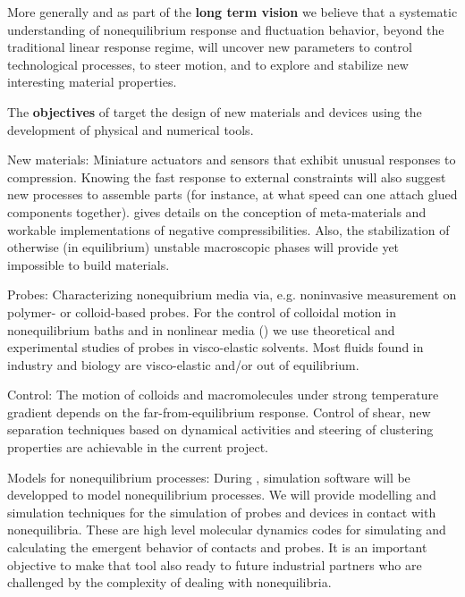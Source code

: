 More generally and as part of the {\bf long term vision} we believe that a systematic
understanding of nonequilibrium response and fluctuation behavior, beyond the traditional
linear response regime, will uncover new parameters to control technological processes, to
steer motion, and to explore and stabilize new interesting material properties.

The {\bf objectives} of \TheProject target the design of new materials and devices using the
development of physical and numerical tools.
\begin{compactdesc}
\item[New materials:] Miniature actuators and sensors that exhibit unusual responses to
compression. Knowing the fast response to external constraints will also suggest new
processes to assemble parts (for instance, at what speed can one attach glued components
together).  gives details on the conception of meta-materials and workable
implementations of negative compressibilities.
%
Also, the stabilization of otherwise (in equilibrium) unstable macroscopic phases will
provide yet impossible to build materials.
\item[Probes:] Characterizing nonequibrium media via, e.g. noninvasive measurement on
polymer- or colloid-based probes. For the control of colloidal motion in nonequilibrium
baths and in nonlinear media () we use theoretical and experimental studies
of probes in visco-elastic solvents. Most fluids found in industry and biology are
visco-elastic and/or out of equilibrium.
\item[Control:] The motion of colloids and macromolecules under strong temperature gradient
depends on the far-from-equilibrium response.
%
Control of shear, new separation techniques based on dynamical activities and steering of
clustering properties are achievable in the current project.
\item[Models for nonequilibrium processes:] During \TheProject, simulation software will be
developped to model nonequilibrium processes. We will provide modelling and simulation
techniques for the simulation of probes and devices in contact with nonequilibria.  These
are high level molecular dynamics codes for simulating and calculating the emergent behavior
of contacts and probes. It is an important objective to make that tool also ready to future
industrial partners who are challenged by the complexity of dealing with nonequilibria.
\end{compactdesc}

